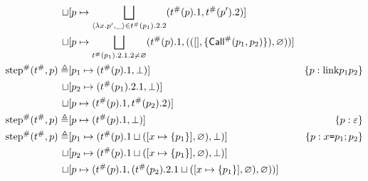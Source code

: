 \documentclass{article}
\begin{document}
\begin{align*}
  \sqcup                             & [p\mapsto\bigsqcup_{\langle\lambda x.p',\_\rangle\in{t}^{\#}(p_1).2.2}({t}^{\#}(p).1,{t}^{\#}(p').2)]                                                                                                                 \\
  \sqcup                             & [p\mapsto\bigsqcup_{{t}^{\#}(p_1).2.1.2\neq\varnothing}({t}^{\#}(p).1,(([],\{{\textsf{Call}}^{\#}(p_1,p_2)\}),\varnothing))]                                                                                                      \\
  {\text{step}}^{\#}({t}^{\#},p) \triangleq & [p_1\mapsto({t}^{\#}(p).1,\bot)]                                                                                                       & \{{p}:{\text{link}{p_1}{p_2}}\}                                                      \\
  \sqcup                             & [p_2\mapsto({t}^{\#}(p_1).2.1,\bot)]                                                                                                                                                                                      \\
  \sqcup                             & [p\mapsto({t}^{\#}(p).1,{t}^{\#}(p_2).2)]                                                                                                                                                                               \\
  {\text{step}}^{\#}({t}^{\#},p) \triangleq & [p\mapsto({t}^{\#}(p).1,\bot)]                                                                                                         & \{{p}:{\varepsilon}\}                                                          \\
  {\text{step}}^{\#}({t}^{\#},p) \triangleq & [p_1\mapsto({t}^{\#}(p).1\sqcup([x\mapsto\{p_1\}],\varnothing),\bot)]                                                                  & \{{p}:{x\texttt{=}p_1;p_2}\}                                                   \\
  \sqcup                             & [p_2\mapsto({t}^{\#}(p).1\sqcup([x\mapsto\{p_1\}],\varnothing),\bot)]                                                                                                                                                     \\
  \sqcup                             & [p\mapsto({t}^{\#}(p).1,({t}^{\#}(p_2).2.1\sqcup([x\mapsto\{p_1\}],\varnothing),\varnothing))]
\end{align*}
\end{document}
